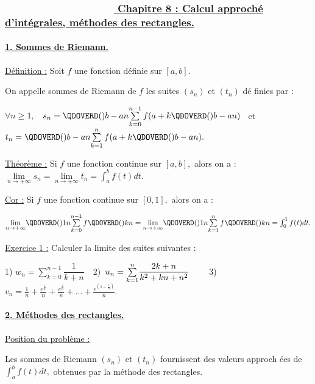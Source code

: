 \documentclass{article}
\begin{document}
\subsubsection{ \ \ \ \ \ \ \ \ \ \ \ \ \ \ \ \ \ \ \ \protect\underline{%
Chapitre 8 : Calcul approch\'{e} d'int\'{e}grales, m\'{e}thodes des
rectangles.}}

\paragraph{\protect\underline{1. Sommes de Riemann.}}

\underline{D\'{e}finition :} Soit $f$ une fonction d\'{e}finie sur $\left[
a,b\right] .$

On appelle sommes de Riemann de $f$ les suites $(s_{n})$ et $(t_{n})$ d\'{e}%
finies par :

$\forall n\geq 1,$ \ $s_{n}=\QDOVERD( ) {b-a}{n}{\sum\limits_{k=0}^{n-1}f(a+k%
}\QDOVERD( ) {b-a}{n})$ \ et \ \ $t_{n}=\QDOVERD( ) {b-a}{n}{%
\sum\limits_{k=1}^{n}f(a+k}\QDOVERD( ) {b-a}{n}).$

\underline{Th\'{e}or\`{e}me :} Si $f$ une fonction continue sur $\left[ a,b%
\right] ,$ alors on a : $\underset{n\rightarrow +\infty }{\lim }s_{n}=%
\underset{n\rightarrow +\infty }{\lim }t_{n}=\int_{a}^{b}f(t)dt.$

\underline{Cor :} Si $f$ une fonction continue sur $\left[ 0,1\right] ,$
alors on a :

$\underset{n\rightarrow +\infty }{\lim }\QDOVERD( ) {1}{n}{%
\sum\limits_{k=0}^{n-1}f}\QDOVERD( ) {k}{n}=\underset{n\rightarrow +\infty }{%
\lim }\QDOVERD( ) {1}{n}{\sum\limits_{k=1}^{n}f}\QDOVERD( )
{k}{n}=\int_{0}^{1}f(t)dt.$

\underline{Exercice 1 :} Calculer la limite des suites suivantes :

1) $w_{n}={\sum\limits_{k=0}^{n-1}}\dfrac{1}{k+n}$\ \ 2)\ $u_{n}={%
\sum\limits_{k=1}^{n}}\dfrac{2k+n}{k^{2}+kn+n^{2}}$ \ \ \ \ 3) $v_{n}=\frac{1%
}{n}+\frac{e^{\frac{1}{n}}}{n}+\frac{e^{\frac{2}{n}}}{n}+...+\frac{e^{(1-%
\frac{1}{n})}}{n}.$

\paragraph{\protect\underline{2. M\'{e}thodes des rectangles.}}

\underline{Position du probl\`{e}me :}

Les sommes de Riemann $(s_{n})$ et $(t_{n})$ fournissent des valeurs approch%
\'{e}es de $\int_{a}^{b}f(t)dt,$ obtenues par la m\'{e}thode des rectangles.
\end{document}
